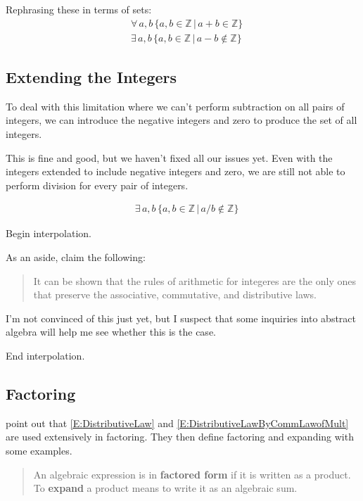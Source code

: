 \documentclass[leqno]{article}
\begin{document}
Rephrasing these in terms of sets:
\begin{align}
    &\forall \, a, b \, \{a, b \in \mathbb{Z} \,|\, a+b \in \mathbb{Z}\}\\
    &\exists \, a, b \, \{a, b \in \mathbb{Z} \,|\, a-b \not\in \mathbb{Z}\}
\end{align}

\subsection{Extending the Integers}

To deal with this limitation
where we can't perform subtraction on all pairs of integers,
we can introduce the negative integers and zero
to produce the set of all integers.

This is fine and good, but we haven't fixed all our issues yet.
Even with the integers extended to include negative integers and zero,
we are still not able to perform division for every pair of integers.

\begin{align}
    &\exists \, a, b \, \{a, b \in \mathbb{Z} \,|\, a/b \not\in \mathbb{Z}\}
\end{align}

\newpage
Begin interpolation.

As an aside, \citeauthor{fisherIntegratedAlgebraTrigonometry1962} claim the following:
\begin{quote}
    It can be shown that the rules of arithmetic
    for integeres are the only ones that preserve
    the associative, commutative, and distributive
    laws.
\end{quote}

I'm not convinced of this just yet, but I suspect that some inquiries into abstract algebra will help me see whether this is the case.

End interpolation.

\subsection{Factoring}

\citeauthor{fisherIntegratedAlgebraTrigonometry1962} point out that
\eqref{E:DistributiveLaw} and \eqref{E:DistributiveLawByCommLawofMult}
are used extensively in factoring.
They then define factoring and expanding with some examples.

\begin{quote}
    An algebraic expression is in \textbf{factored form} if it is written as a product.
    To \textbf{expand} a product means to write it as an algebraic sum.
\end{quote}

\newpage
\printbibliography
\end{document}
